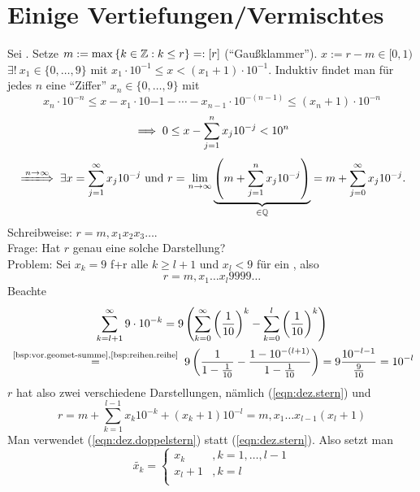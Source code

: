 \documentclass[12pt]{scrreprt}
\begin{document}
\section{Einige Vertiefungen/Vermischtes}
\label{sec:reihen.vermischtes}

\begin{bsp}[Dezimaldarstellung]
  \label{bsp:reihen.dez}
  Sei . Setze $m:=\max{\{k\in\ensuremath{\mathbb{Z}}:k\le r\}} =: [r]$
  ("`Gaußklammer"'). \folgt $x:=r-m \in [0,1)$ \folgt $\exists!\ x_1
  \in \{0,\dotsc,9\}$ mit $x_1\cdot10^{-1} \le x <
  (x_1+1)\cdot10^{-1}$.
  Induktiv findet man für jedes $n$ eine "`Ziffer"'
  $x_n\in\{0,\dotsc,9\}$ mit \[x_n\cdot10^{-n} \le
  x-x_1\cdot10{-1}-\dotsb-x_{n-1}\cdot10^{-(n-1)} \le
  (x_n+1)\cdot10^{-n}\]
  \[\implies 0 \le x - \sum_{j=1}^{n}{x_j10^{-j}}<10^n\]
  \[\folgtwegen{\ninf} \exists x=\sum_{j=1}^{\infty}x_j10^{-j} \text{
    und } r =
  \lim_{\ninf}{\underbrace{\left(m+\sum_{j=1}^n{x_j10^{-j}}\right)}_{\in\set{Q}}}=m+\sum_{j=0}^{\infty}{x_j10^{-j}}.\]
    Schreibweise: $r=m{,}x_1x_2x_3\dotsc$.\\
  Frage: Hat $r$ genau eine solche Darstellung?\\
  Problem: Sei $x_k=9$ f+r alle $k\ge l+1$ und $x_l<9$ für ein
  , also
  \begin{equation}
    \label{eqn:dez.stern}
    r=m{,}x_1\dotsc x_l9999\dotsc \tag{$*$}
  \end{equation}
  Beachte \begin{multline*}
    \sum_{k=l+1}^{\infty}{9\cdot10^{-k}} =
    9\left(\sum_{k=0}^{\infty}\left(\frac{1}{10}\right)^k-\sum_{k=0}^l\left(\frac{1}{10}\right)^k\right)
    \\\nach{=}{\ref{bsp:vor.geomet-summe},\ref{bsp:reihen.reihe}}
    9\left(\frac{1}{1-\frac{1}{10}}-\frac{1-10^{-(l+1)}}{1-\frac{1}{10}}\right)
    = 9\frac{10^{-l-1}}{\frac{9}{10}}=10^{-l}
  \end{multline*}
  $r$ hat also zwei verschiedene Darstellungen, nämlich
  (\ref{eqn:dez.stern}) und
  \begin{equation}
    \label{eqn:dez.doppelstern}
    r=m+\sum_{k=1}^{l-1}{x_k10^{-k}}+(x_k+1)10^{-l}=m{,}x_1\dotsc
    x_{l-1}(x_l+1) \tag{$**$}
  \end{equation}
  Man verwendet (\ref{eqn:dez.doppelstern}) statt
  (\ref{eqn:dez.stern}). Also setzt man
  \[\widetilde{x_k}=
  \begin{cases}
    x_k   &, k=1,\dotsc,l-1 \\
    x_l+1 &, k=l \\

\end{cases}\]
\end{bsp}
\end{document}
